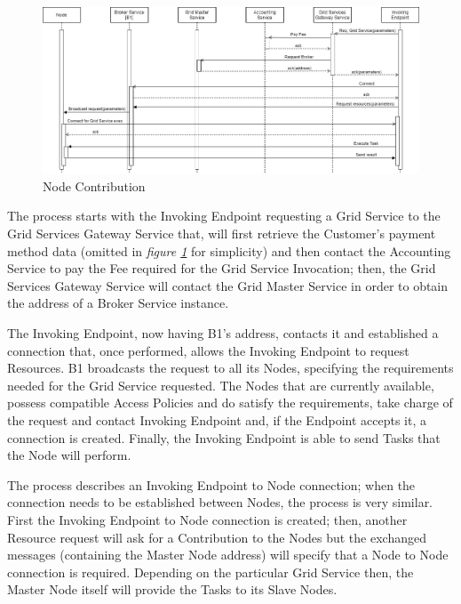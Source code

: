 \begin{itemize}
    \begin{figure}[!ht]
        \centering
        \includegraphics[width=\linewidth]{document/chapters/chapter_6/images/use_cases_satisfaction_node_contribution.jpg}
        \caption{Node Contribution}
        \label{fig:use_cases_satisfaction_node_contribution}
    \end{figure}

    The process starts with the Invoking Endpoint requesting a Grid Service to the Grid Services Gateway Service that, will first retrieve the Customer's payment method data (omitted in \textit{figure \ref{fig:use_cases_satisfaction_node_contribution}} for simplicity) and then contact the Accounting Service to pay the Fee required for the Grid Service Invocation; then, the Grid Services Gateway Service will contact the Grid Master Service in order to obtain the address of a Broker Service instance.

    The Invoking Endpoint, now having B1's address, contacts it and established a connection that, once performed, allows the Invoking Endpoint to request Resources. B1 broadcasts the request to all its Nodes, specifying the requirements needed for the Grid Service requested. The Nodes that are currently available, possess compatible Access Policies and do satisfy the requirements, take charge of the request and contact Invoking Endpoint and, if the Endpoint accepts it, a connection is created. Finally, the Invoking Endpoint is able to send Tasks that the Node will perform.

    The process describes an Invoking Endpoint to Node connection; when the connection needs to be established between Nodes, the process is very similar. First the Invoking Endpoint to Node connection is created; then, another Resource request will ask for a Contribution to the Nodes but the exchanged messages (containing the Master Node address) will specify that a Node to Node connection is required. Depending on the particular Grid Service then, the Master Node itself will provide the Tasks to its Slave Nodes.


\end{itemize}
